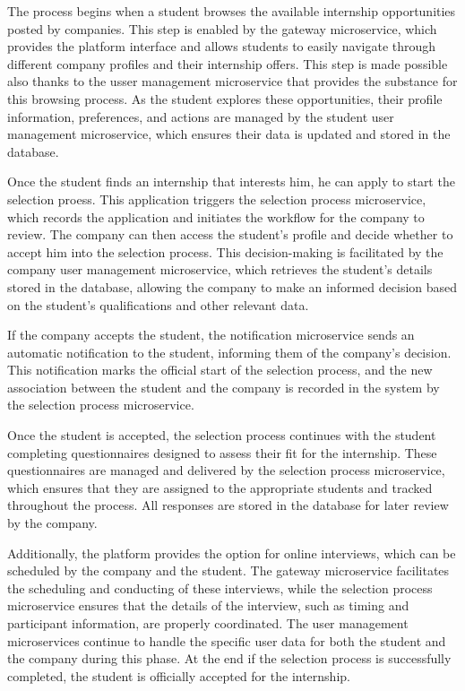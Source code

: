 The process begins when a student browses the available internship opportunities posted
by companies. This step is enabled by the gateway microservice, which provides the platform
interface and allows students to easily navigate through different company profiles and their
internship offers.
This step is made
possible also thanks to the usser management microservice that provides the
substance for this browsing process.
As the student explores these opportunities, their profile information,
preferences, and actions are managed by the student user management microservice, which ensures
their data is updated and stored in the database.

Once the student finds an internship that interests him, he can apply to start the selection
proess. This application triggers the selection process microservice, which records the
application and initiates the workflow for the company to review. The company can then
access the student's profile and decide whether to accept him into the selection process.
This decision-making is facilitated by the company user management microservice, which retrieves
the student's details stored in the database, allowing the company to make an informed decision
based on the student's qualifications and other relevant data.

If the company accepts the student, the notification microservice sends an automatic notification
to the student, informing them of the company's decision. This notification marks the official
start of the selection process, and the new association between the student and the company is
recorded in the system by the selection process microservice.

Once the student is accepted, the selection process continues with the student completing
questionnaires designed to assess their fit for the internship. These questionnaires are
managed and delivered by the selection process microservice, which ensures that they are
assigned to the appropriate students and tracked throughout the process. All responses
are stored in the database for later review by the company.

Additionally, the platform provides the option for online interviews, which can be scheduled
by the company and the student. The gateway microservice facilitates the scheduling and
conducting of these interviews, while the selection process microservice ensures that the
details of the interview, such as timing and participant information, are properly coordinated.
The user management microservices continue to handle the specific user data for both the student
and the company during this phase.
At the end if the selection process is successfully completed, the student is officially
accepted for the internship.

